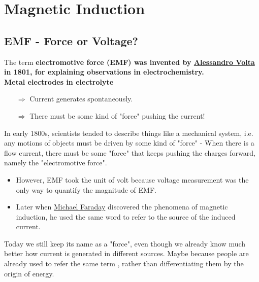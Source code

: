 \documentclass[class=article, crop=false, 12pt]{standalone}
\begin{document}
\linesep
\section{Magnetic Induction}


\subsection{EMF - Force or Voltage?}

The term \bf{electromotive force} (EMF) was invented by 
\href{https://en.wikipedia.org/wiki/Alessandro_Volta}{Alessandro Volta} in 1801,
for explaining observations in electrochemistry.\\

Metal electrodes in electrolyte 
\begin{itemize}
    \item[$\Rightarrow$] Current generates spontaneously.
    \item[$\Rightarrow$] There must be some kind of "force" pushing the current! 
\end{itemize}


In early 1800s, scientists tended to describe things like a mechanical system,
i.e. any motions of objects must be driven by some kind of "force" - 
When there is a flow current, 
there must be some "force" that keeps pushing the charges forward,
namely the "electromotive force". 

\begin{itemize}
    \item However, EMF took the unit of volt because 
    voltage measurement was the only way to quantify the magnitude of EMF.

    \item Later when \href{https://en.wikipedia.org/wiki/Michael_Faraday}{Michael Faraday}
    discovered the phenomena of magnetic induction,
    he used the same word to refer to the source of the induced current.
\end{itemize}


Today we still keep its name as a "force", 
even though we already know much better how current is generated in different sources.
Maybe because people are already used to refer the same term , 
rather than differentiating them by the origin of energy.

\end{document}
